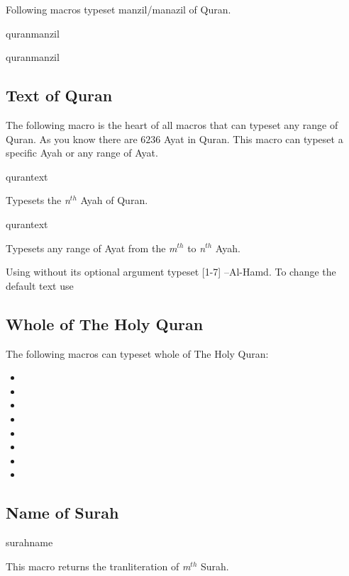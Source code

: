 \documentclass{ltxdoc}
\begin{document}
Following macros typeset manzil/manazil of Quran.

\begin{declcs}{quranmanzil}
\end{declcs}
\begin{declcs}{quranmanzil}
\end{declcs}

\subsection{Text of Quran}
The following macro is the heart of all macros that can typeset any range of Quran. As you know there 
are $6236$ Ayat in Quran. This macro can typeset a specific Ayah or any range of Ayat. 

\begin{declcs}{qurantext}
\end{declcs}
Typesets the \textit{n}$^{th}$ Ayah of Quran. 

\begin{declcs}{qurantext}
\end{declcs}
Typesets any range of Ayat from the \textit{m}$^{th}$ to \textit{n}$^{th}$ Ayah. 
 
Using  without its optional argument typeset [1-7] --Al-Hamd. To
change the default text use 

\subsection{Whole of The Holy Quran}
The following macros can typeset whole of The Holy Quran:

\begin{itemize}
    \item {}
    \item {}
    \item {}
    \item {}
    \item {}
    \item {}
    \item {}
    \item {}
\end{itemize}

\subsection{Name of Surah}
\begin{declcs}{surahname}
\end{declcs}
This macro returns the tranliteration of \textit{m}$^{th}$ Surah.
\end{document}
